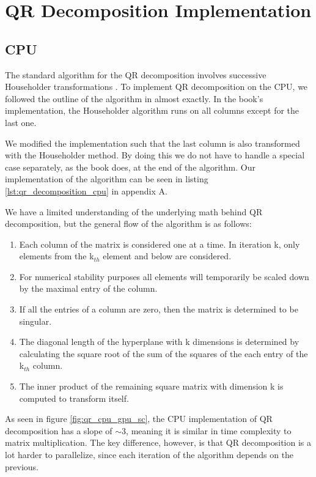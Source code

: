 \section{QR Decomposition Implementation}

\subsection{CPU}

The standard algorithm for the QR decomposition involves successive Householder transformations \cite[Sect. 2.10.4]{numericalrecipes}. To implement QR decomposition on the CPU, we followed the outline of the algorithm in \cite[Sect. 2.10]{numericalrecipes} almost exactly. In the book's implementation, the Householder algorithm runs on all columns except for the last one. 

We modified the implementation such that the last column is also transformed with the Householder method. By doing this we do not have to handle a special case separately, as the book does, at the end of the algorithm. Our implementation of the algorithm can be seen in listing \ref{lst:qr_decomposition_cpu} in appendix A. 

We have a limited understanding of the underlying math behind QR decomposition, but the general flow of the algorithm is as follows:

\begin{enumerate}
    \item Each column of the matrix is considered one at a time. In iteration k, only elements from the k$_{th}$ element and below are considered. 
    \item For numerical stability purposes all elements will temporarily be scaled down by the maximal entry of the column. 
    \item If all the entries of a column are zero, then the matrix is determined to be singular. 
    \item The diagonal length of the hyperplane with k dimensions is determined by calculating the square root of the sum of the squares of the each entry of the k$_{th}$ column. 
    \item The inner product of the remaining square matrix with dimension k is computed to transform itself. 

\end{enumerate}

As seen in figure \ref{fig:qr_cpu_gpu_sc}, the CPU implementation of QR decomposition has a slope of $\sim 3$, meaning it is similar in time complexity to matrix multiplication. The key difference, however, is that QR decomposition is a lot harder to parallelize, since each iteration of the algorithm depends on the previous.

